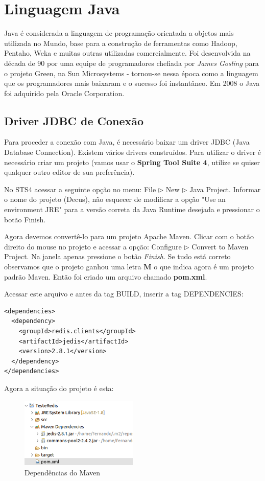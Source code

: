 \section{Linguagem Java}
Java é considerada a linguagem de programação orientada a objetos mais utilizada no Mundo, base para a construção de ferramentas como Hadoop, Pentaho, Weka e muitas outras utilizadas comercialmente. Foi desenvolvida na década de 90 por uma equipe de programadores chefiada por \textit{James Gosling} para o projeto Green, na Sun Microsystems - tornou-se nessa época como a linguagem que os programadores mais baixaram e o sucesso foi instantâneo. Em 2008 o Java foi adquirido pela Oracle Corporation.

\subsection{Driver JDBC de Conexão}
Para proceder a conexão com Java, é necessário baixar um driver JDBC (Java Database Connection). Existem vários drivers construídos. Para utilizar o driver é necessário criar um projeto (vamos usar o \textbf{Spring Tool Suite 4}, utilize se quiser qualquer outro editor de sua preferência).

No STS4 acessar a seguinte opção no menu: File $\triangleright$ New $\triangleright$ Java Project. Informar o nome do projeto (Decus), não esquecer de modificar a opção "Use an environment JRE" para a versão correta da Java Runtime desejada e pressionar o botão Finish.

Agora devemos convertê-lo para um projeto Apache Maven. Clicar com o botão direito do mouse no projeto e acessar a opção: Configure $\triangleright$ Convert to Maven Project. Na janela apenas pressione o botão \textit{Finish}. Se tudo está correto observamos que o projeto ganhou uma letra \textbf{M} o que indica agora é um projeto padrão Maven. Então foi criado um arquivo chamado \textbf{pom.xml}. 

Acessar este arquivo e antes da tag BUILD, inserir a tag DEPENDENCIES:
\begin{lstlisting}[]
<dependencies>
  <dependency>
    <groupId>redis.clients</groupId>
    <artifactId>jedis</artifactId>
    <version>2.8.1</version>
  </dependency>
</dependencies>
\end{lstlisting}

Agora a situação do projeto é esta:
\begin{figure}[H]
	\centering
	\includegraphics[width=0.5\textwidth]{imagens/dependenciasMaven}
	\caption{Dependências do Maven}
\end{figure}

